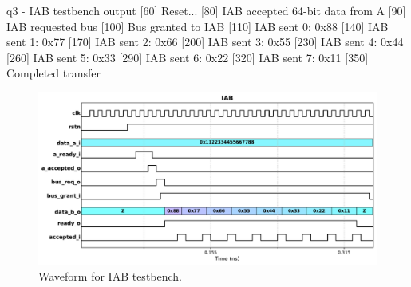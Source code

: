 \documentclass[../main.tex]{subfiles}
\begin{document}
\vspace{-10pt}
\begin{textcode}{q3 - IAB testbench output}
[60] Reset...
[80] IAB accepted 64-bit data from A
[90] IAB requested bus
[100] Bus granted to IAB
[110] IAB sent 0: 0x88
[140] IAB sent 1: 0x77
[170] IAB sent 2: 0x66
[200] IAB sent 3: 0x55
[230] IAB sent 4: 0x44
[260] IAB sent 5: 0x33
[290] IAB sent 6: 0x22
[320] IAB sent 7: 0x11
[350] Completed transfer
\end{textcode}

\vspace{-10pt}
\begin{figure}[H]
    \centering
    \includegraphics[width=\linewidth]{assets/q3_wave.pdf}
    \caption{Waveform for IAB testbench.}
    \label{fig:q3_wave}
\end{figure}
\end{document}
